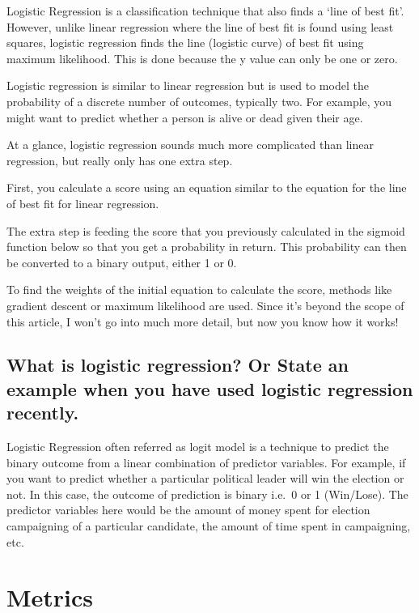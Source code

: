 \documentclass[
]{book}
\begin{document}
Logistic Regression is a classification technique that also finds a `line of best fit'. However, unlike linear regression where the line of best fit is found using least squares, logistic regression finds the line (logistic curve) of best fit using maximum likelihood. This is done because the y value can only be one or zero.

Logistic regression is similar to linear regression but is used to model the probability of a discrete number of outcomes, typically two. For example, you might want to predict whether a person is alive or dead given their age.

At a glance, logistic regression sounds much more complicated than linear regression, but really only has one extra step.

First, you calculate a score using an equation similar to the equation for the line of best fit for linear regression.

The extra step is feeding the score that you previously calculated in the sigmoid function below so that you get a probability in return. This probability can then be converted to a binary output, either 1 or 0.

To find the weights of the initial equation to calculate the score, methods like gradient descent or maximum likelihood are used. Since it's beyond the scope of this article, I won't go into much more detail, but now you know how it works!

\hypertarget{what-is-logistic-regression-or-state-an-example-when-you-have-used-logistic-regression-recently.}{%
\section{What is logistic regression? Or State an example when you have used logistic regression recently.}\label{what-is-logistic-regression-or-state-an-example-when-you-have-used-logistic-regression-recently.}}

Logistic Regression often referred as logit model is a technique to predict the binary outcome from a linear combination of predictor variables. For example, if you want to predict whether a particular political leader will win the election or not. In this case, the outcome of prediction is binary i.e.~0 or 1 (Win/Lose). The predictor variables here would be the amount of money spent for election campaigning of a particular candidate, the amount of time spent in campaigning, etc.

\hypertarget{metrics-4}{%
\chapter{Metrics}\label{metrics-4}}
\end{document}
